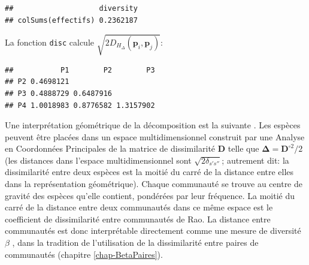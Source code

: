 \documentclass[
  11pt,
  french,
  a4paper,
  extrafontsizes,onecolumn,openright
  ]{memoir}
\newenvironment{Shaded}{\begin{snugshade}}{\end{snugshade}}
\newcommand{\FunctionTok}[1]{\textcolor[rgb]{0.13,0.29,0.53}{\textbf{#1}}}
\newcommand{\NormalTok}[1]{#1}
\newcommand{\SpecialCharTok}[1]{\textcolor[rgb]{0.81,0.36,0.00}{\textbf{#1}}}
\begin{document}
\begin{verbatim}
##                    diversity
## colSums(effectifs) 0.2362187
\end{verbatim}

\normalsize

La fonction \texttt{disc} calcule \(\sqrt{2D_{H_{\Delta}}\left({\mathbf{p}}_i,{\mathbf{p}}_j\right)}\):

\scriptsize

\begin{Shaded}
\end{Shaded}

\begin{verbatim}
##           P1        P2        P3
## P2 0.4698121                    
## P3 0.4888729 0.6487916          
## P4 1.0018983 0.8776582 1.3157902
\end{verbatim}

\normalsize

Une interprétation géométrique de la décomposition est la suivante \autocite{Pavoine2004}.
Les espèces peuvent être placées dans un espace multidimensionnel construit par une Analyse en Coordonnées Principales \autocite{Gower1966} de la matrice de dissimilarité \(\mathbf{D}\) telle que \(\mathbf{\Delta}={\mathbf{D}^{\circ2}}/{2}\) (les distances dans l'espace multidimensionnel sont \(\sqrt{2\delta_{s's''}}\); autrement dit: la dissimilarité entre deux espèces est la moitié du carré de la distance entre elles dans la représentation géométrique).
Chaque communauté se trouve au centre de gravité des espèces qu'elle contient, pondérées par leur fréquence.
La moitié du carré de la distance entre deux communautés dans ce même espace est le coefficient de dissimilarité entre communautés de Rao.
La distance entre communautés est donc interprétable directement comme une mesure de diversité \(\beta\) \autocite{Ricotta2015}, dans la tradition de l'utilisation de la dissimilarité entre paires de communautés (chapitre \ref{chap-BetaPaires}).
\end{document}
